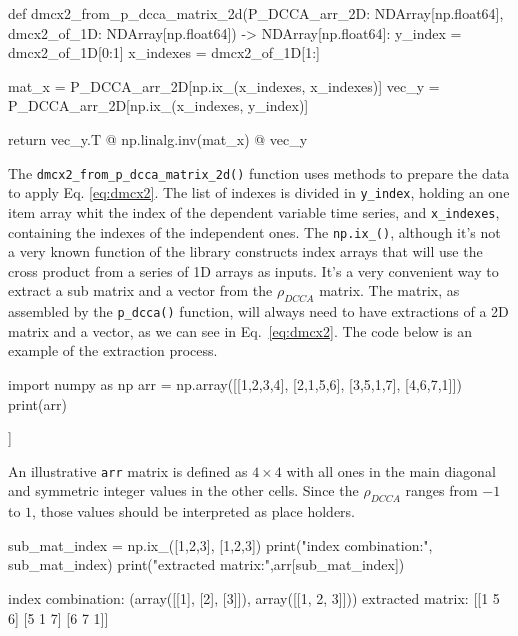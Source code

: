 \documentclass[nojss]{jss}
\begin{document}
\begin{Code}
def dmcx2_from_p_dcca_matrix_2d(P_DCCA_arr_2D: NDArray[np.float64], 
          dmcx2_of_1D: NDArray[np.float64]) -> NDArray[np.float64]:   
  y_index = dmcx2_of_1D[0:1]
  x_indexes = dmcx2_of_1D[1:]

  mat_x = P_DCCA_arr_2D[np.ix_(x_indexes, x_indexes)]
  vec_y = P_DCCA_arr_2D[np.ix_(x_indexes, y_index)]

  return vec_y.T @ np.linalg.inv(mat_x) @ vec_y
\end{Code}

The \verb"dmcx2_from_p_dcca_matrix_2d()" function uses  methods to prepare the data to apply Eq. \ref{eq:dmcx2}. The list of indexes is divided in \verb"y_index", holding an one item array whit the index of the dependent variable time series, and \verb"x_indexes", containing the indexes of the independent ones. The  \verb"np.ix_()", although  it's not a very known function of the library constructs index arrays that will use the cross product from a series of 1D arrays as inputs. It's a very convenient way to extract a sub matrix and a vector from the $\rho_{DCCA}$ matrix. The matrix, as assembled by the \verb"p_dcca()" function, will always need to have extractions of a 2D matrix and a vector, as we can see in Eq.~\ref{eq:dmcx2}. The code below is an example of the extraction process.

\begin{CodeChunk}
\begin{CodeInput}
import numpy as np
arr = np.array([[1,2,3,4],
                [2,1,5,6],
                [3,5,1,7],
                [4,6,7,1]])
print(arr)
\end{CodeInput}

\begin{CodeOutput}
[[1 2 3 4]
 [2 1 5 6]
 [3 5 1 7]
 [4 6 7 1]]
\end{CodeOutput}
\end{CodeChunk}
An illustrative \verb"arr" matrix is defined as $4 \times 4$ with all ones in the main diagonal and symmetric integer values in the other cells. Since the $\rho_{DCCA}$ ranges from $-1$ to $1$, those values should be interpreted as place holders. 
\begin{CodeChunk}
\begin{CodeInput}
sub_mat_index = np.ix_([1,2,3], [1,2,3])
print("index combination:\n", sub_mat_index)
print("extracted matrix:\n",arr[sub_mat_index])
\end{CodeInput}

\begin{CodeOutput}
index combination:
(array([[1],
      [2],
      [3]]), array([[1, 2, 3]]))
extracted matrix:
[[1 5 6]
[5 1 7]
[6 7 1]]
\end{CodeOutput}
\end{CodeChunk}
\end{document}
